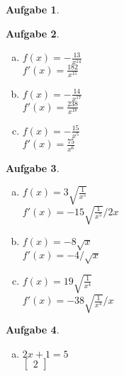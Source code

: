 \documentclass[12pt]{article}
\theoremstyle{note}
\newtheorem{aufgabe}{Aufgabe}
\begin{document}
\begin{flushleft}
\begin{aufgabe}
\begin{multicols}{3}
\begin{enumerate}[a)]
\end{enumerate} 
\end{multicols} 
\end{aufgabe}\vspace{1em}\begin{aufgabe} ~ \ 
\begin{multicols}{3} 
\begin{enumerate}[a)] 
\item $f(x)=$$- \frac{13}{x^{14}}$\\
$f'(x)=$$\frac{182}{x^{15}}$

\item $f(x)=$$- \frac{14}{x^{17}}$\\
$f'(x)=$$\frac{238}{x^{18}}$

\item $f(x)=$$- \frac{15}{x^{5}}$\\
$f'(x)=$$\frac{75}{x^{6}}$

\end{enumerate} 
\end{multicols} 
\end{aufgabe}\vspace{1em}\begin{aufgabe} ~ \ 
\begin{multicols}{3} 
\begin{enumerate}[a)] 
\item $f(x)=$$3 \sqrt{\frac{1}{x^{5}}}$\\
$f'(x)=$$- 15 \sqrt{\frac{1}{x^{5}}} / 2 x$

\item $f(x)=$$- 8 \sqrt{x}$\\
$f'(x)=$$- 4 / \sqrt{x}$

\item $f(x)=$$19 \sqrt{\frac{1}{x^{4}}}$\\
$f'(x)=$$- 38 \sqrt{\frac{1}{x^{4}}} / x$

\end{enumerate} 
\end{multicols} 
\end{aufgabe}\vspace{1em}\begin{aufgabe} ~ \ 
\begin{multicols}{3} 
\begin{enumerate}[a)] 
\item $2 x + 1 = 5$\\
$\begin{bmatrix}2\end{bmatrix}$


\end{enumerate}
\end{multicols}
\end{aufgabe}
\end{flushleft}
\end{document}
